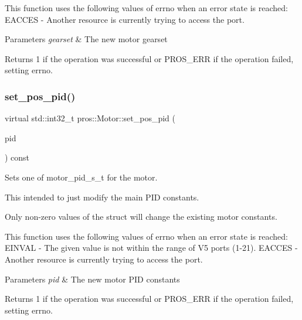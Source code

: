 This function uses the following values of errno when an error state is reached\+: E\+A\+C\+C\+ES -\/ Another resource is currently trying to access the port.


\begin{DoxyParams}{Parameters}
{\em gearset} & The new motor gearset\\
\hline
\end{DoxyParams}
\begin{DoxyReturn}{Returns}
1 if the operation was successful or P\+R\+O\+S\+\_\+\+E\+RR if the operation failed, setting errno. 
\end{DoxyReturn}
\mbox{\label{classpros_1_1Motor_a7a42563b94124faebb50e5731d5664ad}} 
\subsubsection{\texorpdfstring{set\_pos\_pid()}{set\_pos\_pid()}}
{\footnotesize\ttfamily virtual std\+::int32\+\_\+t pros\+::\+Motor\+::set\+\_\+pos\+\_\+pid (\begin{DoxyParamCaption}\item[{const \mbox{\hyperlink{motors_8h_ad2e907c8d7ce53c1fd91f1b9801072e3}{motor\+\_\+pid\+\_\+s\+\_\+t}}}]{pid }\end{DoxyParamCaption}) const\hspace{0.3cm}{\ttfamily [virtual]}}



Sets one of motor\+\_\+pid\+\_\+s\+\_\+t for the motor. 

This intended to just modify the main P\+ID constants.

Only non-\/zero values of the struct will change the existing motor constants.

This function uses the following values of errno when an error state is reached\+: E\+I\+N\+V\+AL -\/ The given value is not within the range of V5 ports (1-\/21). E\+A\+C\+C\+ES -\/ Another resource is currently trying to access the port.


\begin{DoxyParams}{Parameters}
{\em pid} & The new motor P\+ID constants\\
\hline
\end{DoxyParams}
\begin{DoxyReturn}{Returns}
1 if the operation was successful or P\+R\+O\+S\+\_\+\+E\+RR if the operation failed, setting errno. 
\end{DoxyReturn}
\mbox{\label{classpros_1_1Motor_a67cff0666b34c3731e21e856414c2066}} 
